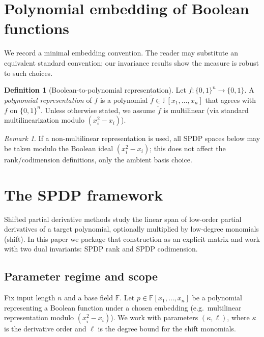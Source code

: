 \documentclass[12pt]{article}
\theoremstyle{definition}
\newtheorem{definition}[theorem]{Definition}
\theoremstyle{remark}
\newtheorem{remark}[theorem]{Remark}
\newcommand{\bits}{\{0,1\}}
\newcommand{\F}{\mathbb{F}}
\begin{document}
\section{Polynomial embedding of Boolean functions}
\label{sec:embedding}
We record a minimal embedding convention. The reader may substitute an equivalent
standard convention; our invariance results show the measure is robust to such
choices.

\begin{definition}[Boolean-to-polynomial representation]
\label{def:spdp-boolean}
Let $f:\bits^n\to\bits$. A \emph{polynomial representation} of $f$ is a polynomial
$\tilde f\in\F[x_1,\dots,x_n]$ that agrees with $f$ on $\bits^n$.
Unless otherwise stated, we assume $\tilde f$ is multilinear (via standard
multilinearization modulo $(x_i^2-x_i)$).
\end{definition}

\begin{remark}
\label{rem:non-multilinear}
If a non-multilinear representation is used, all SPDP spaces below may be taken
modulo the Boolean ideal $(x_i^2-x_i)$; this does not affect the rank/codimension
definitions, only the ambient basis choice.
\end{remark}

\section{The SPDP framework}
\label{sec:spdp-framework}

Shifted partial derivative methods study the linear span of low-order partial
derivatives of a target polynomial, optionally multiplied by low-degree monomials
(shift). In this paper we package that construction as an explicit matrix and
work with two dual invariants: SPDP rank and SPDP codimension.

\subsection{Parameter regime and scope}
\label{subsec:params-scope}

Fix input length $n$ and a base field $\F$. Let $p \in \F[x_1,\dots,x_n]$ be a
polynomial representing a Boolean function under a chosen embedding (e.g.\ multilinear
representation modulo $(x_i^2-x_i)$). We work with parameters $(\kappa,\ell)$, where
$\kappa$ is the derivative order and $\ell$ is the degree bound for the shift monomials.
\end{document}
